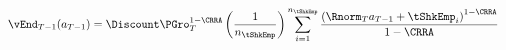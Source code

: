   \begin{equation}\begin{gathered}\begin{aligned}
    \vEnd_{T-1}({a}_{T-1})  & =   \Discount \PGro_{T}^{1-\CRRA}\left(\frac{1}{n_{\tShkEmp}}\right)\sum_{i=1}^{n_{\tShkEmp}}   \frac{\left( \Rnorm_{T} {a}_{T-1} + \tShkEmp_{i}\right)^{1-\CRRA}}{1-\CRRA} \label{eq:vDiscrete}
  \end{aligned}\end{gathered}\end{equation}
